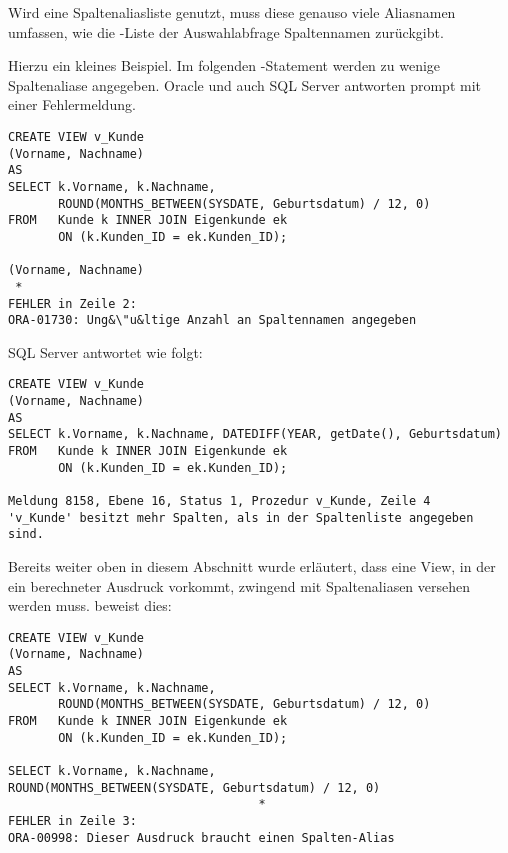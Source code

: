         \begin{merke}
          Wird eine Spaltenaliasliste genutzt, muss diese genauso viele Aliasnamen umfassen, wie die \SELECT-Liste der Auswahlabfrage Spaltennamen zur\"uckgibt.
        \end{merke}
        Hierzu ein kleines Beispiel. Im folgenden -Statement werden zu wenige Spaltenaliase angegeben. Oracle und auch SQL Server antworten prompt mit einer Fehlermeldung.
        \begin{lstlisting}[language=oracle_sql,caption={Eine einfache View mit fehlerhafter Spaltenaliasliste in Oracle},label=sql08_31]
CREATE VIEW v_Kunde
(Vorname, Nachname)
AS
SELECT k.Vorname, k.Nachname,
       ROUND(MONTHS_BETWEEN(SYSDATE, Geburtsdatum) / 12, 0)
FROM   Kunde k INNER JOIN Eigenkunde ek
       ON (k.Kunden_ID = ek.Kunden_ID);

(Vorname, Nachname)
 *
FEHLER in Zeile 2:
ORA-01730: Ung&\"u&ltige Anzahl an Spaltennamen angegeben
        \end{lstlisting}
        SQL Server antwortet wie folgt:
        \begin{lstlisting}[language=ms_sql,caption={Eine einfache View mit fehlerhafter Spaltenaliasliste in SQL Server},label=sql08_32]
CREATE VIEW v_Kunde
(Vorname, Nachname)
AS
SELECT k.Vorname, k.Nachname, DATEDIFF(YEAR, getDate(), Geburtsdatum)
FROM   Kunde k INNER JOIN Eigenkunde ek
       ON (k.Kunden_ID = ek.Kunden_ID);

Meldung 8158, Ebene 16, Status 1, Prozedur v_Kunde, Zeile 4
'v_Kunde' besitzt mehr Spalten, als in der Spaltenliste angegeben sind.
        \end{lstlisting}
        Bereits weiter oben in diesem Abschnitt wurde erl\"autert, dass eine View, in der ein berechneter Ausdruck vorkommt, zwingend mit Spaltenaliasen versehen werden muss.  beweist dies:
        \begin{lstlisting}[language=oracle_sql,caption={Eine View mit einer berechneten Spalte in Oracle},label=sql08_33]
CREATE VIEW v_Kunde
(Vorname, Nachname)
AS
SELECT k.Vorname, k.Nachname,
       ROUND(MONTHS_BETWEEN(SYSDATE, Geburtsdatum) / 12, 0)
FROM   Kunde k INNER JOIN Eigenkunde ek
       ON (k.Kunden_ID = ek.Kunden_ID);

SELECT k.Vorname, k.Nachname,
ROUND(MONTHS_BETWEEN(SYSDATE, Geburtsdatum) / 12, 0)
                                   *
FEHLER in Zeile 3:
ORA-00998: Dieser Ausdruck braucht einen Spalten-Alias
        \end{lstlisting}

